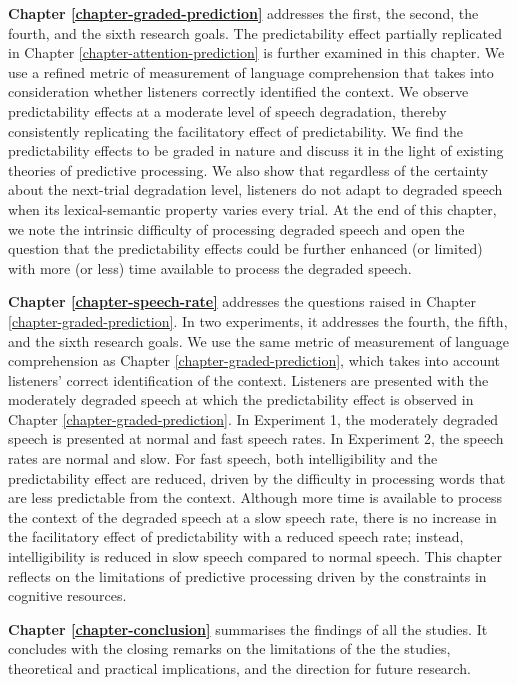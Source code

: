\documentclass[a4paper, nobind]{templates/ociamthesis}
\begin{document}
\noindent
\textbf{Chapter \ref{chapter-graded-prediction}} addresses the first, the second, the fourth, and the sixth research goals.
The predictability effect partially replicated in Chapter \ref{chapter-attention-prediction} is further examined in this chapter.
We use a refined metric of measurement of language comprehension that takes into consideration whether listeners correctly identified the context.
We observe predictability effects at a moderate level of speech degradation, thereby consistently replicating the facilitatory effect of predictability.
We find the predictability effects to be graded in nature
and discuss it in the light of existing theories of predictive processing.
We also show that regardless of the certainty about the next-trial degradation level,
listeners do not adapt to degraded speech when its lexical-semantic property varies every trial.
At the end of this chapter, we note the intrinsic difficulty of processing degraded speech and open the question that the predictability effects could be further enhanced (or limited) with more (or less) time available to process the degraded speech.

\noindent
\textbf{Chapter \ref{chapter-speech-rate}} addresses the questions raised in Chapter \ref{chapter-graded-prediction}.
In two experiments, it addresses the fourth, the fifth, and the sixth research goals.
We use the same metric of measurement of language comprehension as Chapter \ref{chapter-graded-prediction}, which takes into account listeners' correct identification of the context.
Listeners are presented with the moderately degraded speech at which the predictability effect is observed in Chapter \ref{chapter-graded-prediction}.
In Experiment 1, the moderately degraded speech is presented at normal and fast speech rates.
In Experiment 2, the speech rates are normal and slow.
For fast speech, both intelligibility and the predictability effect are reduced, driven by the difficulty in processing words that are less predictable from the context.
Although more time is available to process the context of the degraded speech at a slow speech rate,
there is no increase in the facilitatory effect of predictability with a reduced speech rate;
instead, intelligibility is reduced in slow speech compared to normal speech.
This chapter reflects on the limitations of predictive processing driven by the constraints in cognitive resources.

\noindent
\textbf{Chapter \ref{chapter-conclusion}} summarises the findings of all the studies.
It concludes with the closing remarks on the limitations of the the studies, theoretical and practical implications, and the direction for future research.
\end{document}

